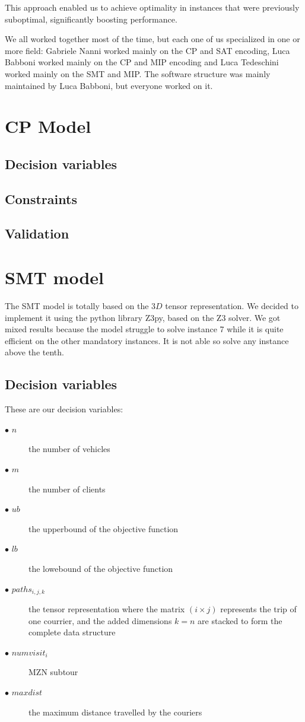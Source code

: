 \documentclass{article}
\begin{document}
This approach enabled us to achieve optimality in instances that were previously suboptimal, significantly boosting performance.

We all worked together most of the time, but each one of us specialized in one or more field: Gabriele Nanni worked mainly on the CP and SAT encoding, Luca Babboni worked mainly on the CP and MIP encoding and Luca Tedeschini worked mainly on the SMT and MIP. The software structure was mainly maintained by Luca Babboni, but everyone worked on it.


\section{CP Model}
\subsection{Decision variables}
\subsection{Constraints}
\subsection{Validation}
\section{SMT model}
The SMT model is totally based on the $3D$ tensor representation. We decided to implement it using the python library Z3py, based on the Z3 solver. We got mixed results because the model struggle to solve instance 7 while it is quite efficient on the other mandatory instances. It is not able so solve any instance above the tenth.  
\subsection{Decision variables}
These are our decision variables:
\begin{description}
	\item[$\bullet$ $n$] the number of vehicles
	\item[$\bullet$ $m$] the number of clients
	\item[$\bullet$ $ub$] the upperbound of the objective function
	\item[$\bullet$ $lb$] the lowebound of the objective function
	\item[$\bullet$ $paths_{i,j,k}$] the tensor representation where the matrix $(i \times j)$ represents the trip of one courrier, and the added dimensions $k=n$ are stacked to form the complete data structure
	\item[$\bullet$ $numvisit_i$] MZN subtour %
	\item[$\bullet$ $maxdist$] the maximum distance travelled by the couriers
\end{description}
\end{document}
